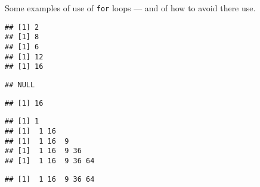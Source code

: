 \documentclass[paper=a4,headsepline,BCOR=12mm,twoside,open=right,%
titlepage,headings=small,fontsize=10pt,index=totoc,bibliography=totoc,%
captions=tableheading,captions=nooneline]{scrbook}\usepackage{knitr}
\begin{document}
Some examples of use of \texttt{for} loops --- and of how to avoid there use.

\begin{knitrout}\footnotesize
{}\color{fgcolor}\begin{kframe}
\begin{alltt}
 \hlkwb{<-} \hlstd{(}\hlstd{,} \hlstd{,} \hlstd{,} \hlstd{,} \hlstd{)}
  \hlopt{*} 
   \hlopt{*}\hlstd{)} 
\end{alltt}
\begin{verbatim}
## [1] 2
## [1] 8
## [1] 6
## [1] 12
## [1] 16
\end{verbatim}
\begin{alltt}
 \hlkwb{<-}   \hlopt{*} 
\end{alltt}
\begin{verbatim}
## NULL
\end{verbatim}
\begin{alltt}
   \hlkwb{<-} \hlopt{*} 
\end{alltt}
\begin{verbatim}
## [1] 16
\end{verbatim}
\begin{alltt}
  \hlstd{(}
   \hlkwb{<-} \hlopt{^}
\hlstd{\}}
\end{alltt}
\begin{verbatim}
## [1] 1
## [1]  1 16
## [1]  1 16  9
## [1]  1 16  9 36
## [1]  1 16  9 36 64
\end{verbatim}
\begin{alltt}
 
\end{alltt}
\begin{verbatim}
## [1]  1 16  9 36 64
\end{verbatim}
\begin{alltt}
 \hlkwb{<-} \hlstd{(}

\end{alltt}
\end{kframe}
\end{knitrout}
\end{document}
